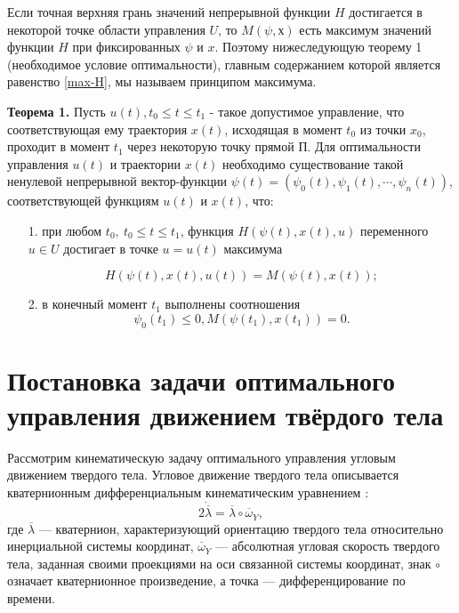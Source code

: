 \documentclass[14pt]{extreport}
\begin{document}
Если точная верхняя грань значений непрерывной функ­ции $H$ достигается в некоторой точке области управления $U$, то $M(\psi, х)$ есть максимум значений функ­ции $H$ при фиксированных $\psi$ и $x$. Поэтому нижеследую­щую теорему 1 (необходимое условие оптимальности), главным содержанием которой является равенство \eqref{max-H}, мы называем принципом максимума.

\textbf{Теорема 1.} Пусть $u(t), t_0 \leq t \leq t_1$ - такое допустимое управление, что соответствующая ему траекто­рия $x(t)$, исходящая в момент $t_0$ из точки $x_0$, проходит в момент $t_1$ через некоторую точку прямой П. Для оптимальности управления $u(t)$ и траектории $x(t)$ необходимо существование такой ненулевой непрерыв­ной вектор-функции $\psi(t)=(\psi_0(t),\psi_1(t),\cdots,\psi_n(t))$, со­ответствующей функциям $u(t)$ и $x(t)$, что:
\begin{itemize}
\item[1.] при любом $t_0,\ t_0 \leq t \leq t_1$, функция $H(\psi(t),x(t),u)$ переменного $u\in U$ достигает в точке $u = u(t)$ макси­мума 

\begin{equation}
\label{max-H}
H(\psi(t),x(t),u(t))=M(\psi(t),x(t));
\end{equation}
\item[2.] в конечный момент $t_1$ выполнены соотношения
\begin{equation}
\label{fin-ratio}
\psi_0(t_1) \leq 0, M(\psi(t_1),x(t_1))=0.
\end{equation}
\end{itemize}

\chapter{Постановка задачи оптимального управления движением твёрдого тела}
Рассмотрим кинематическую задачу оптимального управления угло­вым движением твердого тела. Угловое движение твердого тела описыва­ется кватернионным дифференциальным кинематическим уравнением \cite{buhgolz}:
\begin{equation}
\label{diff-kinematic-eq}
2\dot{\overline{\lambda}} = \overline{\lambda} \circ \overline{\omega}_{Y},
\end{equation}
где $\overline{\lambda}$ — кватернион, характеризующий ориентацию твердого тела относи­тельно инерциальной системы координат, $\overline{\omega}_{Y}$ — абсолютная угловая скорость твердого тела, заданная своими проекциями на оси связанной си­стемы координат, знак $\circ$ означает кватернионное произведение, а точка — дифференцирование по времени. 
\end{document}
